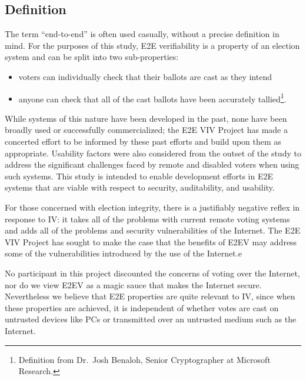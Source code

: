 \subsection{Definition}
\label{sec:definition}

The term ``end-to-end'' is often used casually, without a precise
definition in mind. For the purposes of this study, E2E verifiability
is a property of an election system and can be split into two sub-properties:  
\begin{itemize}
\item voters can individually check that their ballots are cast as they
intend
\item anyone can check that all of the cast ballots have been accurately tallied\footnote{Definition from Dr.~Josh
  Benaloh, Senior Cryptographer at Microsoft Research.}.
\end{itemize}

While systems of this nature have been developed in the past, none
have been broadly used or successfully commercialized; the E2E VIV
Project has made a concerted effort to be informed by these past
efforts and build upon them as appropriate. Usability factors were
also considered from the outset of the study to address the
significant challenges faced by remote and disabled voters when using
such systems. This study is intended to enable development efforts in
E2E systems that are viable with respect to security, auditability,
and usability.

For those concerned with election integrity, there is a justifiably
negative reflex in response to IV: it takes all of the problems with
current remote voting systems and adds all of the problems and
security vulnerabilities of the Internet. 
The E2E VIV Project has sought to make the case that 
the benefits of E2EV may address some of the vulnerabilities
introduced by the use of the Internet.e

No participant in this project discounted the concerns of voting over
the Internet, nor do we view E2EV as a magic sauce that makes the
Internet secure. Nevertheless we believe that E2E properties are quite
relevant to IV, since when these properties are achieved, it is independent of whether votes
are cast on untrusted devices like PCs or transmitted over an
untrusted medium such as the Internet.

